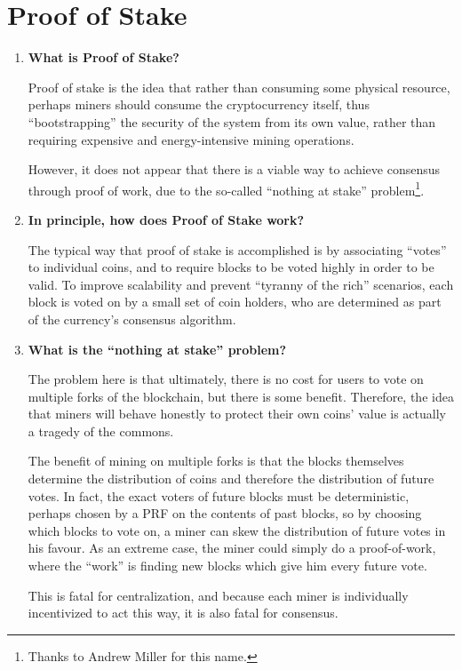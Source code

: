 \documentclass[letterpaper]{article}
\theoremstyle{xxx}
\theoremstyle{evil}
\theoremstyle{yyy}
\theoremstyle{plain}
\theoremstyle{zzz}
\begin{document}
\section{Proof of Stake}
\begin{enumerate}
\item \textbf{What is Proof of Stake?}

Proof of stake is the idea that rather than consuming some physical resource,
perhaps miners should consume the cryptocurrency itself, thus ``bootstrapping''
the security of the system from its own value, rather than requiring expensive
and energy-intensive mining operations.

However, it does not appear that there is a viable way to achieve consensus
through proof of work, due to the so-called ``nothing at stake'' problem\footnote{Thanks
to Andrew Miller for this name.}.

\item \textbf{In principle, how does Proof of Stake work?}

The typical way that proof of stake is accomplished is by associating ``votes''
to individual coins, and to require blocks to be voted highly in order to be
valid. To improve scalability and prevent ``tyranny of the rich'' scenarios, each
block is voted on by a small set of coin holders, who are determined as part
of the currency's consensus algorithm.

\item \textbf{What is the ``nothing at stake'' problem?}

The problem here is that ultimately, there is no cost for users to vote on multiple
forks of the blockchain, but there is some benefit. Therefore, the idea that miners
will behave honestly to protect their own coins' value is actually a tragedy of the
commons.

The benefit of mining on multiple forks is that the blocks themselves determine
the distribution of coins and therefore the distribution of future votes. In fact,
the exact voters of future blocks must be deterministic, perhaps chosen by a PRF
on the contents of past blocks, so by choosing which blocks to vote on, a miner
can skew the distribution of future votes in his favour. As an extreme case, the
miner could simply do a proof-of-work, where the ``work'' is finding new blocks
which give him every future vote.

This is fatal for centralization, and because each miner is individually
incentivized to act this way, it is also fatal for consensus.

\end{enumerate}
\end{document}
